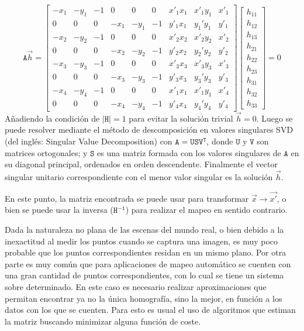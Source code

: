\begin{displaymath}
\mathtt{A}\vec{h}=
\begin{bmatrix}
-x_1&-y_1&-1&0&0&0&x'_1x_1&x'_1y_1&x'_1\\
0&0&0&-x_1&-y_1&-1&y'_1x_1&y_1'y_1&y'_1\\
-x_2&-y_2&-1&0&0&0&x'_2x_2&x'_2y_2&x'_2\\
0&0&0&-x_2&-y_2&-1&y'_2x_2&y_2'y_2&y'_2\\
-x_3&-y_3&-1&0&0&0&x'_3x_3&x'_3y_3&x'_3\\
0&0&0&-x_3&-y_3&-1&y'_3x_3&y_3'y_3&y'_3\\
-x_4&-y_4&-1&0&0&0&x'_1x_1&x'_1y_1&x'_4\\
0&0&0&-x_4&-y_4&-1&y'_4x_4&y_4'y_4&y'_4
\end{bmatrix}
\begin{bmatrix}
h_{11}\\h_{12}\\h_{13}\\h_{21}\\h_{22}\\h_{23}\\h_{31}\\h_{32}\\h_{33}
\end{bmatrix}
= 0
\end{displaymath}
Añadiendo la condición de 	 $\left | \mathtt{H} \right | = 1$ para evitar la solución trivial $\vec{h}=0$. Luego se puede resolver mediante el método de descomposición en valores singulares SVD (del inglés: Singular Value Decomposition) con $\mathtt{A} = \mathtt{U}\mathtt{S}\mathtt{V}^\mathtt{T}$, donde $\mathtt{U}$ y $\mathtt{V}$ son matrices ortogonales; y $\mathtt{S}$ es una matriz formada con los valores singulares de $\mathtt{A}$ en su diagonal principal, ordenados en orden descendente. Finalmente el vector singular unitario correspondiente con el menor valor singular es la solución $\vec{h}$.

En este punto, la matriz encontrada se puede usar para transformar $\vec{x} \to \vec{x'}$, o bien se puede usar la inversa ($\mathtt{H^{-1}}$) para realizar el mapeo en sentido contrario.

Dada la naturaleza no plana de las escenas del mundo real, o bien debido a la inexactitud al medir los puntos cuando se captura una imagen, es muy poco probable que los puntos correspondientes residan en un mismo plano. Por otra parte es muy común que para aplicaciones de mapeo automático se cuenten con una gran cantidad de puntos correspondientes, con lo cual se tiene un sistema sobre determinado. En este caso es necesario realizar aproximaciones que permitan encontrar ya no la única homografía, sino la mejor, en función a los datos con los que se cuenten. Para esto es usual el uso de algoritmos que estiman la matriz buscando minimizar alguna función de coste.


